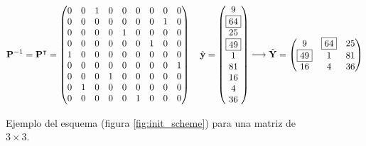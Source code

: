 \begin{figure}[H]
	\[
	\mathbf{P}^{-1} = \mathbf{P}^\intercal = \left(
		\begin{matrix}
			0&0&1&0&0&0&0&0&0\\
			0&0&0&0&0&0&0&1&0\\
			0&0&0&0&1&0&0&0&0\\
			0&0&0&0&0&0&1&0&0\\
			1&0&0&0&0&0&0&0&0\\
			0&0&0&0&0&0&0&0&1\\
			0&0&0&1&0&0&0&0&0\\
			0&1&0&0&0&0&0&0&0\\
			0&0&0&0&0&1&0&0&0\\
		\end{matrix}
	\right)
	\quad
	\hat{\mathbf{y}} = \left(
		\begin{matrix}
			9\\\boxed{64}\\25\\\boxed{49}\\1\\81\\16\\4\\36
		\end{matrix}
	\right) \longrightarrow 
	\hat{\mathbf{Y}} = \left(
		\begin{matrix}
			9 & \boxed{64} & 25\\
			\boxed{49} &  1 & 81\\
			16 &  4 & 36\\
		\end{matrix}
	\right)
	\]
	\caption{Ejemplo del esquema (figura \ref{fig:init_scheme}) para una matriz de $3 \times 3$.}
	\label{ex:init_scheme}
\end{figure}

